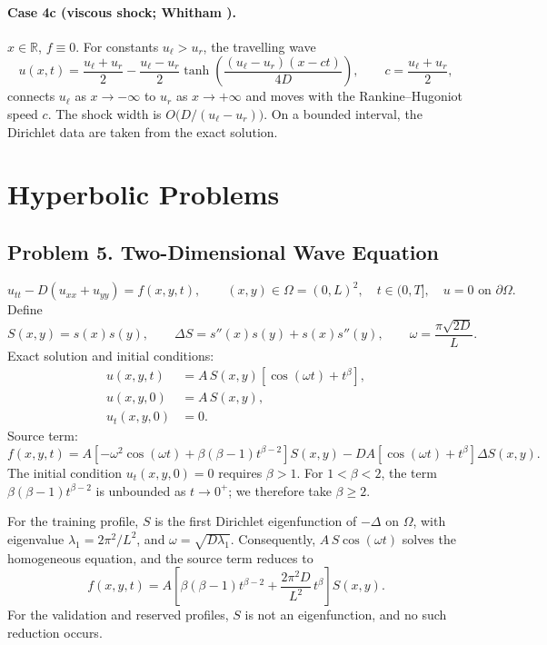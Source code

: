 \documentclass[11pt]{article}
\begin{document}
\paragraph{Case 4c (viscous shock; Whitham \cite[Ch.~4]{Whi74}).}
$x\in\mathbb{R}$, $f\equiv0$. For constants $u_\ell>u_r$, the travelling
wave
\[
u(x,t)=\frac{u_\ell+u_r}{2}
-\frac{u_\ell-u_r}{2}
\tanh\!\left(\frac{(u_\ell-u_r)(x-ct)}{4D}\right),
\qquad
c=\frac{u_\ell+u_r}{2},
\]
connects $u_\ell$ as $x\to-\infty$ to $u_r$ as $x\to+\infty$ and moves
with the Rankine--Hugoniot speed $c$. The shock width is
$O\bigl(D/(u_\ell-u_r)\bigr)$. On a bounded interval, the Dirichlet data
are taken from the exact solution.

\section{Hyperbolic Problems}

\subsection*{Problem 5. Two-Dimensional Wave Equation}

\[
\boxed{u_{tt}-D(u_{xx}+u_{yy})=f(x,y,t)},
\qquad (x,y)\in\Omega=(0,L)^2,
\quad t\in(0,T],
\quad u=0 \text{ on } \partial\Omega .
\]
Define
\[
S(x,y)=s(x)s(y),
\qquad
\Delta S=s''(x)s(y)+s(x)s''(y),
\qquad
\omega=\frac{\pi\sqrt{2D}}{L}.
\]
Exact solution and initial conditions:
\[
\begin{aligned}
u(x,y,t)&=A\,S(x,y)\left[\cos(\omega t)+t^\beta\right],\\
u(x,y,0)&=A\,S(x,y),\\
u_t(x,y,0)&=0.
\end{aligned}
\]
Source term:
\[
f(x,y,t)
=A\left[
-\omega^2\cos(\omega t)
+\beta(\beta-1)t^{\beta-2}
\right]S(x,y)
-DA\left[\cos(\omega t)+t^\beta\right]\Delta S(x,y).
\]
The initial condition $u_t(x,y,0)=0$ requires $\beta>1$. For
$1<\beta<2$, the term $\beta(\beta-1)t^{\beta-2}$ is unbounded as
$t\to0^+$; we therefore take $\beta\ge2$.

For the training profile, $S$ is the first Dirichlet eigenfunction of
$-\Delta$ on $\Omega$, with eigenvalue $\lambda_1=2\pi^2/L^2$, and
$\omega=\sqrt{D\lambda_1}$. Consequently, $A\,S\cos(\omega t)$ solves the
homogeneous equation, and the source term reduces to
\[
f(x,y,t)=A\left[\beta(\beta-1)t^{\beta-2}+\frac{2\pi^2D}{L^2}\,t^\beta\right]S(x,y).
\]
For the validation and reserved profiles, $S$ is not an eigenfunction,
and no such reduction occurs.
\end{document}
